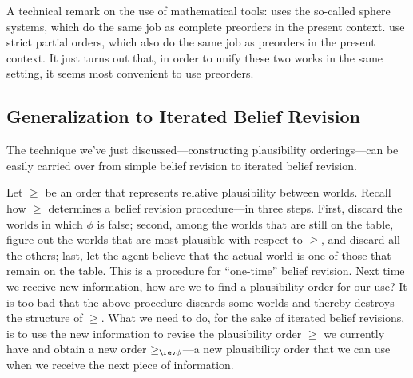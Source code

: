 A technical remark on the use of mathematical tools: 
\citet{grove1988two} uses the so-called sphere systems, which do the same job as complete preorders in the present context. \citet{kraus1990nonmonotonic} use strict partial orders, which also do the same job as preorders in the present context. It just turns out that, in order to unify these two works in the same setting, it seems most convenient to use preorders.

\subsection{Generalization to Iterated Belief Revision}\label{sec-iterated}

The technique we've just discussed---constructing plausibility orderings---can be easily carried over from simple belief revision to iterated belief revision. 

Let $\ge$ be an order that represents relative plausibility between worlds. Recall how $\ge$ determines a belief revision procedure---in three steps. First, discard the worlds in which $\phi$ is false; second, among the worlds that are still on the table, figure out the worlds that are most plausible with respect to $\ge$, and discard all the others; last, let the agent believe that the actual world is one of those that remain on the table. This is a procedure for ``one-time'' belief revision. Next time we receive new information, how are we to find a plausibility order for our use? It is too bad that the above procedure discards some worlds and thereby destroys the structure of $\ge$. What we need to do, for the sake of iterated belief revisions, is to use the new information to revise the plausibility order $\ge$ we currently have and obtain a new order $\ge_{\rev\phi}$---a new plausibility order that we can use when we receive the next piece of information.

